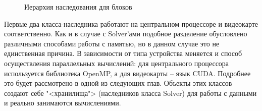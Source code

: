 \documentclass[a4paper, 14pt]{extarticle}
\theoremstyle{definition}
\begin{document}
\begin{figure}[h]
	\caption{Иерархия наследования для блоков}
	\label{ris:blocks}
\end{figure}

\par Первые два класса-наследника работают на центральном процессоре и видеокарте соответственно. Как и в случае с Solver'ами подобное разделение обусловлено различными способами работы с памятью, но в данном случае это не единственная причина. В зависимости от типа устройства меняется и способ осуществления параллельных вычислений: для центрального процессора используется библиотека OpenMP, а для видеокарты -- язык CUDA. Подробнее это будет рассмотрено в одной из следующих глав. Объекты этих классов создают себе "<хранилища"> (наследников класса Solver) для работы с данными и реально занимаются вычислениями.


\end{document}
